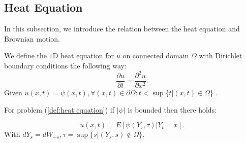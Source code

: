 \documentclass[a4paper,12pt]{article}
\begin{document}
\begin{pythonn}
\end{pythonn}

\subsection{Heat Equation}
In this subsection, we introduce the relation between the heat equation and
Brownian motion.

\begin{definition} \label{def:heat equation}
    We define the $1$D heat equation for $u$ on connected domain $\Omega$
    with  Dirichlet boundary conditions the following way:
    \begin{equation}
        \frac{\partial u}{\partial t} = \frac{\partial^{2} u}{\partial x ^{2}}.
    \end{equation}
    Given $u(x,t)=\psi(x,t) ,\forall (x,t) \in \partial \Omega: t<\sup \{
        t| (x,t) \in \Omega\}$ .
\end{definition}

\begin{lemma} \label{lem:BM HE}
    For problem (\ref{def:heat equation}) if $ |\psi|$ is bounded
    then there holds:

    \begin{equation}
        u(x,t)=E[\psi(Y_{\tau},\tau) | Y_{t} =x].
    \end{equation}
    With $dY_{s} = dW_{-s},\tau = \sup\{s | (Y_{s},s) \notin \Omega\}$.
\end{lemma}
\end{document}

